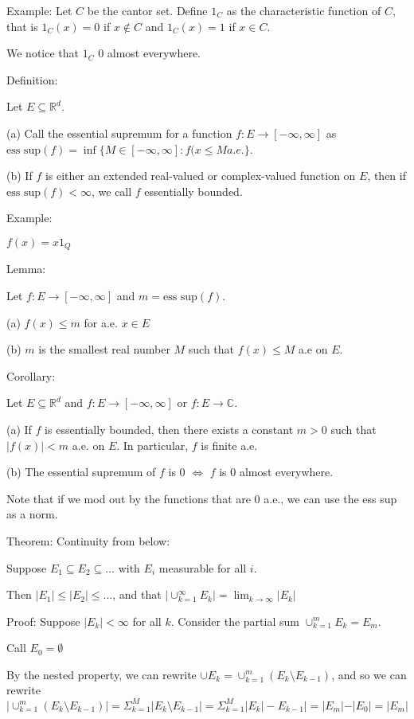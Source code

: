 \documentclass[10pt]{article}
\begin{document}
Example: Let $C$ be the cantor set. Define $1_C$ as the characteristic function of $C$, that is $1_C(x) = 0$ if $x \not \in C$ and $1_C(x) = 1$ if $x \in C$.

We notice that $1_C$ 0 almost everywhere.

Definition:

Let $E \subseteq \mathbb{R}^d$.

(a) Call the essential supremum for a function $f: E \to [-\infty,\infty]$ as $\text{ess sup}(f) =\inf \{ M \in [-\infty,\infty] : f(x \leq M a.e.\}$.

(b) If $f$ is either an extended real-valued or complex-valued function on $E$, then if $\text{ess sup}(f) < \infty$, we call $f$ essentially bounded.

Example:

$f(x) = x 1_Q$

Lemma: 

Let $f: E \to [-\infty,\infty]$ and $m = \text{ess sup}(f)$. 

(a) $f(x) \leq m $ for a.e. $x\in E$

(b) $m$ is the smallest real number $M$ such that $f(x) \leq M$ a.e on $E$.

Corollary:

Let $E \subseteq \mathbb{R}^d$ and $f: E \to [-\infty,\infty]$ or $f: E \to \mathbb{C}$.

(a) If $f$ is essentially bounded, then there exists a constant $m > 0 $ such that $|f(x)|< m$ a.e. on $E$. In particular, $f$ is finite a.e.

(b) The essential supremum of $f$ is 0 $\iff$ $f$ is 0 almost everywhere.

Note that if we mod out by the functions that are 0 a.e., we can use the ess sup as a norm.

Theorem: Continuity from below:

Suppose $E_1 \subseteq E_2 \subseteq ...$ with $E_i$ measurable for all $i$.

Then $|E_1| \leq |E_2| \leq ...$, and that $| \cup_{k=1}^\infty E_k | = \lim_{k\to \infty} |E_k|$

Proof: Suppose $|E_k| < \infty$ for all $k$. Consider the partial sum $\cup_{k=1}^m E_k = E_m$.

Call $E_0 = \emptyset$

By the nested property, we can rewrite $\cup E_k = \cup_{k=1}^m (E_k \setminus E_{k-1})$, and so we can rewrite $|\cup_{k=1}^m (E_k \setminus E_{k-1})| = \Sigma_{k=1}^M | E_k \setminus E_{k-1} | = \Sigma_{k=1}^M | E_k | -  E_{k-1} | = |E_m| - |E_0|  = |E_m|$
\end{document}
